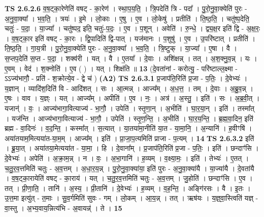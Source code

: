 \documentclass[17pt]{extarticle}
\begin{document}
                  \newline
                                \textbf{ TS 2.6.2.6} \newline
                  व॒ष॒ट्का॒रेणेति॑ वषट् - का॒रेण॑ । स्था॒प॒य॒ति॒ । त्रि॒पदेति॑ त्रि - पदा᳚ । पु॒रो॒नु॒वा॒क्येति॑ पुरः - अ॒नु॒वा॒क्या᳚ । भ॒व॒ति॒ । त्रयः॑ । इ॒मे । लो॒काः । ए॒षु । ए॒व । लो॒केषु॑ । प्रतीति॑ । ति॒ष्ठ॒ति॒ । चतु॑ष्प॒देति॒ चतुः॑ - प॒दा॒ । या॒ज्या᳚ । चतु॑ष्पद॒ इति॒ चतुः॑-प॒दः॒ । ए॒व । प॒शून् । अवेति॑ । रु॒न्धे॒ । द्व्य॒क्ष॒र इति॑ द्वि - अ॒क्ष॒रः॒ । व॒ष॒ट्का॒र इति॑ वषट् - का॒रः । द्वि॒पादिति॑ द्वि-पात् । यज॑मानः । प॒शुषु॑ । ए॒व । उ॒परि॑ष्टात् । प्रतीति॑ । ति॒ष्ठ॒ति॒ । गा॒य॒त्री । पु॒रो॒नु॒वा॒क्येति॑ पुरः - अ॒नु॒वा॒क्या᳚ । भ॒व॒ति॒ । त्रि॒ष्टुक् । या॒ज्या᳚ । ए॒षा । वै । स॒प्तप॒देति॑ स॒प्त - प॒दा॒ । शक्व॑री । यत् । वै । ए॒तया᳚ । दे॒वाः । अशि॑क्षन्न् । तत् । अ॒श॒क्नु॒व॒न्न् । यः । ए॒वम् । वेद॑ । श॒क्नोति॑ । ए॒व ( ) । यत् । शिक्ष॑ति ॥ \textbf{  13} \newline
                  \newline
                      (दे॒वता॑नां - करोत्यु॒ - परि॑ष्टाल्ल॒क्ष्मा - ऽऽज्य॑भागौ॒ - प्रति॑ - श॒क्रोत्ये॒व - द्वे च॑ )  \textbf{(A2)} \newline \newline
                                \textbf{ TS 2.6.3.1} \newline
                  प्र॒जाप॑ति॒रिति॑ प्र॒जा - प॒तिः॒ । दे॒वेभ्यः॑ । य॒ज्ञान् । व्यादि॑श॒दिति॑ वि - आदि॑शत् । सः । आ॒त्मन्न् । आज्य᳚म् । अ॒ध॒त्त॒ । तम् । दे॒वाः । अ॒ब्रु॒व॒न्न् । ए॒षः । वाव । य॒ज्ञ्ः । यत् । आज्य᳚म् । अपीति॑ । ए॒व । नः॒ । अत्र॑ । अ॒स्तु॒ । इति॑ । सः । अ॒ब्र॒वी॒त् । यजान्॑ । वः॒ । आज्य॑भागा॒वित्याज्य॑ - भा॒गौ॒ । उपेति॑ । स्तृ॒णा॒न् । अ॒भीति॑ । घा॒र॒या॒न् । इति॑ । तस्मा᳚त् । यज॑न्ति । आज्य॑भागा॒वित्याज्य॑ - भा॒गौ॒ । उपेति॑ । स्तृ॒ण॒न्ति॒ । अ॒भीति॑ । घा॒र॒य॒न्ति॒ । ब्र॒ह्म॒वा॒दिन॒ इति॑ ब्रह्म - वा॒दिनः॑ । व॒द॒न्ति॒ । कस्मा᳚त् । स॒त्यात् । या॒तया॑मा॒नीति॑ या॒त - या॒मा॒नि॒ । अ॒न्यानि॑ । ह॒वीꣳषि॑ । अया॑तयाम॒मित्यया॑त-या॒म॒म् । आज्य᳚म् । इति॑ । प्रा॒जा॒प॒त्यमिति॑ प्राजा - प॒त्यम् । \textbf{  14} \newline
                  \newline
                                \textbf{ TS 2.6.3.2} \newline
                  इति॑ । ब्रू॒या॒त् । अया॑तया॒मेत्यया॑त - या॒मा॒ । हि । दे॒वाना᳚म् । प्र॒जाप॑ति॒रिति॑ प्र॒जा - प॒तिः॒ । इति॑ । छन्दाꣳ॑सि । दे॒वेभ्यः॑ । अपेति॑ । अ॒क्रा॒म॒न्न् । न । वः॒ । अ॒भा॒गानि॑ । ह॒व्यम् । व॒क्ष्या॒मः॒ । इति॑ । तेभ्यः॑ । ए॒तत् । च॒तु॒र॒व॒त्तमिति॑ चतुः - अ॒व॒त्तम् । अ॒धा॒र॒य॒न्न् । पु॒रो॒नु॒वा॒क्या॑या॒ इति॑ पुरः - अ॒नु॒वा॒क्या॑यै । या॒ज्या॑यै । दे॒वता॑यै । व॒ष॒ट्का॒रायेति॑ वषट् - का॒राय॑ । यत् । च॒तु॒र॒व॒त्तमिति॑ चतुः - अ॒व॒त्तम् । जु॒होति॑ । छन्दाꣳ॑सि । ए॒व । तत् । प्री॒णा॒ति॒ । तानि॑ । अ॒स्य॒ । प्री॒तानि॑ । दे॒वेभ्यः॑ । ह॒व्यम् । व॒ह॒न्ति॒ । अङ्गि॑रसः । वै । इ॒तः । उ॒त्त॒मा इत्यु॑त् - त॒माः । सु॒व॒र्गमिति॑ सुवः - गम् । लो॒कम् । आ॒य॒न्न् । तत् । ऋष॑यः । य॒ज्ञ्॒वा॒स्त्विति॑ यज्ञ् - वा॒स्तु । अ॒भ्य॒वाय॒न्नित्य॑भि - अ॒वायन्न्॑ । ते । \textbf{  15} \newline
\end{document}
